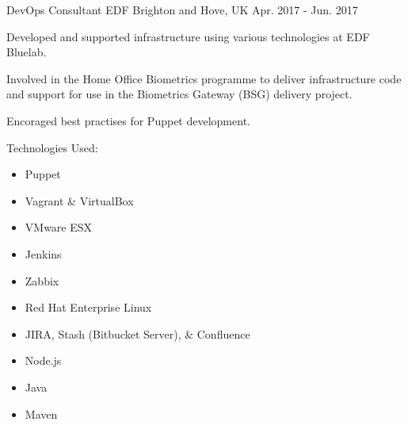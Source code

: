 \begin{cventries}
    \cventry
    {DevOps Consultant} %
    {EDF} %
    {Brighton and Hove, UK} %
    {Apr. 2017 - Jun. 2017} %
    {
        \begin{cvitems} %
            \item {Developed and supported infrastructure using various technologies at EDF Bluelab.}
            \item {Involved in the Home Office Biometrics programme to deliver infrastructure code and support for use in the Biometrics Gateway (BSG) delivery project.}
            \item {Encoraged best practises for Puppet development.}
            \item {Technologies Used: }
            \begin{itemize}
                \item {Puppet}
                \item {Vagrant \& VirtualBox}
                \item {VMware ESX}
                \item {Jenkins}
                \item {Zabbix}
                \item {Red Hat Enterprise Linux}
                \item {JIRA, Stash (Bitbucket Server), \& Confluence}
                \item {Node.js}
                \item {Java}
                \item {Maven}
            \end{itemize}
        \end{cvitems}
    }


\end{cventries}
